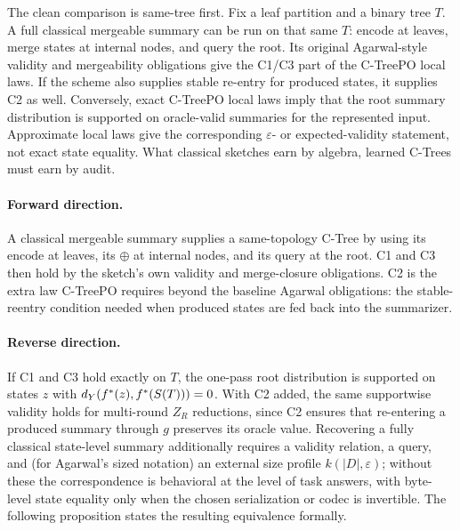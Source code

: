 The clean comparison is same-tree first. Fix a leaf partition and a
binary tree \(T\). A full classical mergeable summary can be run on
that same \(T\): encode at leaves, merge states at internal nodes, and
query the root. Its original Agarwal-style validity and mergeability
obligations give the C1/C3 part of the C-TreePO local laws. If the
scheme also supplies stable re-entry for produced states, it supplies
C2 as well. Conversely, exact C-TreePO local laws imply that the root
summary distribution is supported on oracle-valid summaries for the
represented input. Approximate local laws give the corresponding
\(\varepsilon\)- or expected-validity statement, not exact state
equality. What classical sketches earn by algebra, learned C-Trees
must earn by audit.

\paragraph{Forward direction.}
A classical mergeable summary supplies a same-topology C-Tree by using
its \(\mathrm{encode}\) at leaves, its \(\oplus\) at internal nodes,
and its \(\mathrm{query}\) at the root. C1 and C3 then hold by the
sketch's own validity and merge-closure obligations. C2 is the extra
law C-TreePO requires beyond the baseline Agarwal obligations: the
stable-reentry condition needed when produced states are fed back into
the summarizer.

\paragraph{Reverse direction.}
If C1 and C3 hold exactly on \(T\), the one-pass root distribution is
supported on states \(z\) with \(d_Y(f^\ast(z),f^\ast(S(T)))=0\). With
C2 added, the same supportwise validity holds for multi-round \(Z_R\)
reductions, since C2 ensures that re-entering a produced summary
through \(g\) preserves its oracle value. Recovering a fully classical
state-level summary additionally requires a validity relation, a
query, and (for Agarwal's sized notation) an external size profile
\(k(|D|,\varepsilon)\); without these the correspondence is
behavioral at the level of task answers, with byte-level state equality
only when the chosen serialization or codec is invertible. The
following proposition states the resulting equivalence formally.

